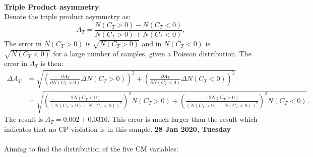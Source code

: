 \\
\textbf{Triple Product asymmetry}:
\\
Denote the triple product asymmetry as:
\begin{equation}
    A_T = \frac{N(C_T > 0) - N(C_T < 0)}{N(C_T > 0) + N(C_T < 0)},
    \label{triple_product_asy}
\end{equation}
The error in $N(C_T > 0)$ is $\sqrt{N(C_T > 0)}$ and in $N(C_T < 0)$ is $\sqrt{N(C_T <0)}$ for a large number of samples, given a Poisson distribution. The error in $A_T$ is then:
\begin{align}
    \Delta A_T &= \sqrt{\left(\frac{\partial A_T}{\partial N(C_T > 0)}\Delta N(C_T > 0)\right) ^ 2 + \left(\frac{\partial A_T}{\partial N(C_T < 0)}\Delta N(C_T < 0)\right) ^ 2} \\\nonumber
               &= \sqrt{\left(\frac{2N(C_T < 0)}{(N(C_T > 0) + N(C_T < 0))^2}\right)^2 N(C_T > 0) + \left(\frac{-2N(C_T > 0)}{(N(C_T > 0) + N(C_T < 0))^2}\right)^2 N(C_T < 0)} .
\end{align}
The result is $A_T = 0.002 \pm 0.0316$. This error is much larger than the result which indicates that no CP violation is in this sample.
\clearpage
\noindent\textbf{28 Jan 2020, Tuesday}
\\
\\
Aiming to find the distribution of the five CM variables:
